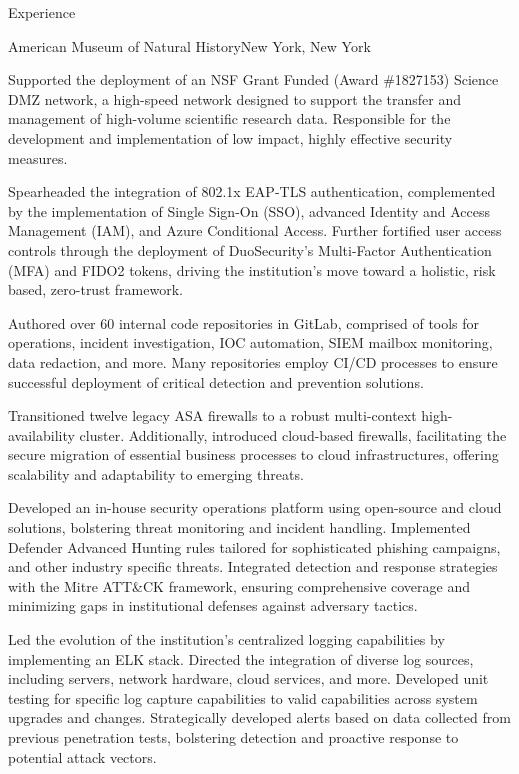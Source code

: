 \documentclass[]{mcdowellcv}
\begin{document}
\begin{cvsection}{Experience}
\begin{jobentry}{American Museum of Natural History}{New York, New York}
        \begin{jobprojects}
            \item Supported the deployment of an NSF Grant Funded (Award \#1827153) Science DMZ network, a high-speed network designed to support the transfer and management of high-volume scientific research data. Responsible for the development and implementation of low impact, highly effective security measures.
            \item Spearheaded the integration of 802.1x EAP-TLS authentication, complemented by the implementation of Single Sign-On (SSO), advanced Identity and Access Management (IAM), and Azure Conditional Access. Further fortified user access controls through the deployment of DuoSecurity's Multi-Factor Authentication (MFA) and FIDO2 tokens, driving the institution's move toward a holistic, risk based, zero-trust framework.
            \item Authored over 60 internal code repositories in GitLab, comprised of tools for operations, incident investigation, IOC automation, SIEM mailbox monitoring, data redaction, and more. Many repositories employ CI/CD processes to ensure successful deployment of critical detection and prevention solutions.
            \item Transitioned twelve legacy ASA firewalls to a robust multi-context high-availability cluster. Additionally, introduced cloud-based firewalls, facilitating the secure migration of essential business processes to cloud infrastructures, offering scalability and adaptability to emerging threats.
            \item Developed an in-house security operations platform using open-source and cloud solutions, bolstering threat monitoring and incident handling. Implemented Defender Advanced Hunting rules tailored for sophisticated phishing campaigns, and other industry specific threats. Integrated detection and response strategies with the Mitre ATT\&CK framework, ensuring comprehensive coverage and minimizing gaps in institutional defenses against adversary tactics.
            \item Led the evolution of the institution's centralized logging capabilities by implementing an ELK stack. Directed the integration of diverse log sources, including servers, network hardware, cloud services, and more. Developed unit testing for specific log capture capabilities to valid capabilities across system upgrades and changes. Strategically developed alerts based on data collected from previous penetration tests, bolstering detection and proactive response to potential attack vectors.

\end{jobprojects}
\end{jobentry}
\end{cvsection}
\end{document}
